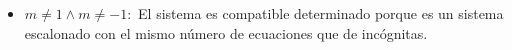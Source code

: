\documentclass[palatino,nosec,nochap]{Docencia}
\begin{document}
\begin{problem}
\begin{itemize}
\[\begin{array}{ccccc}
		\end{array}
		\right\} \dimplies 
		\left\{
		\begin{array}{ccccc}
		
		\end{array}
		\right\}
	\]
	El sistema es compatible indeterminado porque es un sistema escalonado en función de un parámetro con más incógnitas que ecuaciones.


	\item $m≠1 \wedge m≠-1:$ El sistema es compatible determinado porque es un sistema escalonado con el mismo número de ecuaciones que de incógnitas. 
\end{itemize}


\end{problem}
\end{document}
